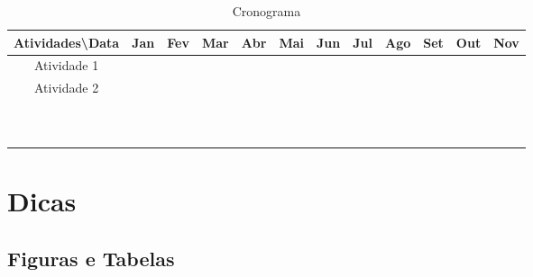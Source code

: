 \documentclass[12pt,oneside,a4paper,chapter=TITLE,english,brazil,sumario=abnt-6027-2012]{abntex2}
\begin{document}
\begin{table}[H]
	\centering
	\caption{Cronograma}
	\begin{tabular}{|c|c|c|c|c|c|c|c|c|c|c|c|}
		\toprule
		Atividades\textbackslash{}Data & Jan   & Fev   & Mar   & Abr   & Mai   & Jun   & Jul   & Ago   & Set   & Out   & Nov \\
		\midrule
		Atividade 1 &       &       &       &       &       &       &       &       &       &       &  \\
		\midrule
		Atividade 2 &       &       &       &       &       &       &       &       &       &       &  \\
		\midrule
		&       &       &       &       &       &       &       &       &       &       &  \\
		\midrule
		&       &       &       &       &       &       &       &       &       &       &  \\
		\midrule
		&       &       &       &       &       &       &       &       &       &       &  \\
		\midrule
		&       &       &       &       &       &       &       &       &       &       &  \\
		\midrule
		&       &       &       &       &       &       &       &       &       &       &  \\
		\midrule
		&       &       &       &       &       &       &       &       &       &       &  \\
		\midrule
		&       &       &       &       &       &       &       &       &       &       &  \\
		\midrule
		&       &       &       &       &       &       &       &       &       &       &  \\
		\midrule
		&       &       &       &       &       &       &       &       &       &       &  \\
		\midrule
		&       &       &       &       &       &       &       &       &       &       &  \\
		\bottomrule
	\end{tabular}%
	\label{tab:addlabel}%
\end{table}%


\chapter{Dicas}

\section {Figuras e Tabelas}
\end{document}
